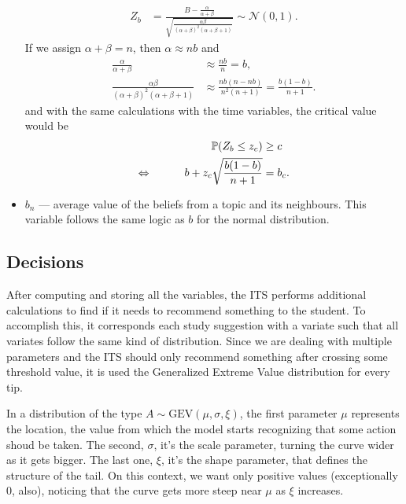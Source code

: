 \documentclass{article}
\newcommand{\0}{\mathbbold{0}}
\newcommand{\1}{\mathds{1}}
\newcommand{\2}{\mathbbold{2}}
\newcommand{\LRA}{\Leftrightarrow\mkern40mu}
\newcommand{\GEV}[3]{\text{GEV}\!\left(#1,#2,#3\right)}
\begin{document}
\begin{itemize}
\begin{align*}
        Z_b &= \frac{B - \frac{\alpha}{\alpha + \beta}}{\sqrt{\frac{\alpha\beta}{(\alpha+\beta)^2(\alpha+\beta+1)}}} \sim \mathcal{N}(0,1).
    \end{align*}
    If we assign $\alpha + \beta = n$, then $\alpha \approx nb$ and
    \begin{align*}
        \frac{\alpha}{\alpha+\beta} &\approx \frac{nb}{n} = b, \\
        \frac{\alpha\beta}{(\alpha+\beta)^2(\alpha+\beta+1)} &\approx \frac{nb(n-nb)}{n^2(n+1)} = \frac{b(1-b)}{n+1}.
    \end{align*}
    and with the same calculations with the time variables, the critical value would be
    \begin{alignat*}{2}
        && \mathbb{P}(Z_b \le z_c) &\ge c \\
        \LRA && b + z_c\sqrt{\frac{b(1-b)}{n+1}} &= b_c.
    \end{alignat*}
    \item $b_n$ — average value of the beliefs from a topic and its neighbours. This variable follows the same logic as $b$ for the normal distribution.
\end{itemize}

\subsection{Decisions}
After computing and storing all the variables, the ITS performs additional calculations to find if it needs to recommend something to the student. 
To accomplish this, it corresponds each study suggestion with a variate such that all variates follow the same kind of distribution.
Since we are dealing with multiple parameters and the ITS should only recommend something after crossing some threshold value, it is used the Generalized Extreme Value distribution for every tip.

In a distribution of the type $A \sim \GEV{\mu}{\sigma}{\xi}$, the first parameter $\mu$ represents the location, the value from which the model starts recognizing that some action shoud be taken.
The second, $\sigma$, it's the scale parameter, turning the curve wider as it gets bigger. The last one, $\xi$, it's the shape parameter, that defines the structure of the tail. On this context, we want only positive values (exceptionally 0, also), noticing that the curve gets more steep near $\mu$ as $\xi$ increases.
\end{document}
